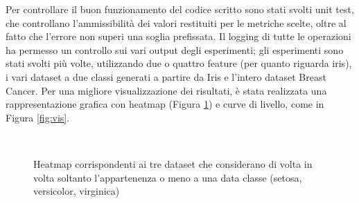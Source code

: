 \documentclass[oneside, openany]{book}
\begin{document}
	Per controllare il buon funzionamento del codice scritto sono stati svolti unit test, che controllano l'ammissibilità dei valori restituiti per le metriche scelte, oltre al fatto che l'errore non superi una soglia prefissata. Il logging di tutte le operazioni ha permesso un controllo sui vari output degli esperimenti; gli esperimenti sono stati svolti più volte, utilizzando due o quattro feature (per quanto riguarda iris), i vari dataset a due classi generati a partire da Iris e l'intero dataset Breast Cancer.
	Per una migliore visualizzazione dei risultati, è stata realizzata una rappresentazione grafica con heatmap (Figura \ref{fig:hm}) e curve di livello, come in Figura \ref{fig:vis}. 
	\begin{figure}[h!]
		\quad 
		\quad
		\\
		\caption{Heatmap corrispondenti ai tre dataset che considerano di volta in volta soltanto l'appartenenza o meno a una data classe (setosa, versicolor, virginica)}
		\label{fig:hm}
	\end{figure}
\end{document}
